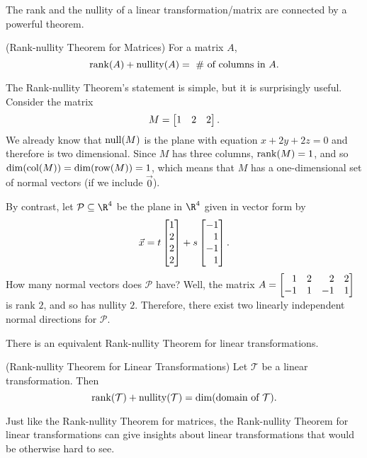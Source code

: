 
The rank and the nullity of a linear transformation/matrix are connected by a powerful theorem.

\begin{theorem}(Rank-nullity Theorem for Matrices) For a matrix $A$,
\[
	\operatorname{rank}(A)+\operatorname{nullity}(A)=\ \#\text{ of columns in $A$}.
\]
\end{theorem}

The Rank-nullity Theorem's statement is simple, but it is surprisingly useful. Consider
the matrix \[M=\mat{1&2&2}.\] We already know that $\operatorname{null}(M)$ is the plane with equation
$x+2y+2z=0$ and therefore is two dimensional. Since $M$ has three columns, $\operatorname{rank}(M)=1$, and
so $\operatorname{dim}(\operatorname{col}(M))=\operatorname{dim}(\operatorname{row}(M))=1$, which means that $M$ has a one-dimensional set of normal vectors 
(if we include $\vec 0$).

By contrast, let $\mathcal P\subseteq \R^4$ be the plane in $\R^4$ given in vector form by
\[
	\vec x=t\mat{1\\2\\2\\2}+s\mat{-1\\1\\-1\\1}.
\]
How many normal vectors does $\mathcal P$ have? Well, the matrix $A=\mat{1&2&2&2\\-1&1&-1&1}$ is rank $2$,
and so has nullity $2$. Therefore, there exist two linearly independent normal directions for $\mathcal P$.

\medskip
There is an equivalent Rank-nullity Theorem for linear transformations.
\begin{theorem}(Rank-nullity Theorem for Linear Transformations) Let $\mathcal T$ be a linear transformation.
Then
\[
	\operatorname{rank}(\mathcal T)+\operatorname{nullity}(\mathcal T)=\operatorname{dim}(\text{domain of $\mathcal T$}).
\]
\end{theorem}

Just like the Rank-nullity Theorem for matrices, the Rank-nullity Theorem for linear transformations
can give insights about linear transformations that would be otherwise hard to see.

